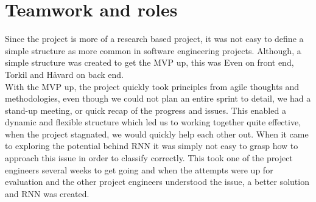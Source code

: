 \section{Teamwork and roles}
Since the project is more of a research based project, it was not easy to define a simple structure as more common in software engineering projects. Although, a simple structure was created to get the MVP up, this was Even on front end, Torkil and Håvard on back end. \\ %
With the MVP up, the project quickly took principles from agile thoughts and methodologies, even though we could not plan an entire sprint to detail, we had a stand-up meeting, or quick recap of the progress and issues. This enabled a dynamic and flexible structure which led us to working together quite effective, when the project stagnated, we would quickly help each other out. When it came to exploring the potential behind RNN it was simply not easy to grasp how to approach this issue in order to classify correctly. This took one of the project engineers several weeks to get going and when the attempts were up for evaluation and the other project engineers understood the issue, a better solution and RNN was created. %






